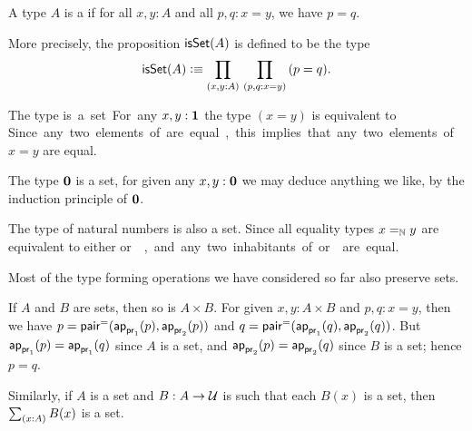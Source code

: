 \documentclass[hott-all.tex]{subfiles}
\begin{document}
\begin{defn}
  A type $A$ is a 
  if for all $x,y:A$ and all $p,q:x=y$, we have $p=q$.
\end{defn}

More precisely, the proposition $\isset(A)$ is defined to be the type
\[ \isset(A) \defeq \prd{x,y:A}{p,q:x=y} (p=q). \]
%
%

\begin{eg}
  The type \unit is a set.
  For any $x,y:\unit$ the type $(x=y)$ is equivalent to \unit.
  Since any two elements of \unit are equal, this implies that any two elements of $x=y$ are equal.
\end{eg}

\begin{eg}
  The type $\emptyt$ is a set, for given any $x,y:\emptyt$ we may deduce anything we like, by the induction principle of $\emptyt$.
\end{eg}

\begin{eg}
  The type \nat of natural numbers is also a set.
  Since all equality types $\id[\nat]xy$ are equivalent to either \unit or \emptyt, and any two inhabitants of \unit or \emptyt are equal.
\end{eg}

Most of the type forming operations we have considered so far also preserve sets.

\begin{eg}
  If $A$ and $B$ are sets, then so is $A\times B$.
  For given $x,y:A\times B$ and $p,q:x=y$, then
  we have $p= \pairpath(\projpath1(p),\projpath2(p))$ and $q= \pairpath(\projpath1(q),\projpath2(q))$.
  But $\projpath1(p)=\projpath1(q)$ since $A$ is a set, and $\projpath2(p)=\projpath2(q)$ since $B$ is a set; hence $p=q$.

  Similarly, if $A$ is a set and $B:A\to\type$ is such that each $B(x)$ is a set, then $\sm{x:A} B(x)$ is a set.
\end{eg}
\end{document}
